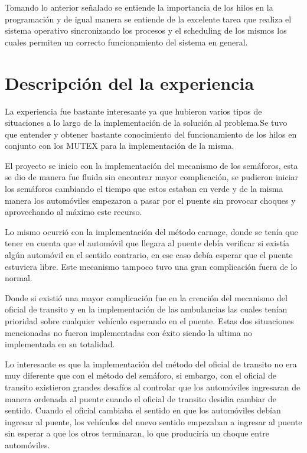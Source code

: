 \documentclass[16pt,a4papper]{article}
\begin{document}
	Tomando lo anterior señalado se entiende la importancia de los hilos en la programación y de igual manera se entiende de la excelente tarea que realiza el sistema operativo sincronizando los procesos y el scheduling de los mismos los cuales permiten un correcto funcionamiento del sistema en general.
	
	\newpage
	\section{Descripción del la experiencia}
	La experiencia fue bastante interesante ya que hubieron varios tipos de situaciones a lo largo de la implementación de la solución al problema.Se tuvo que entender y obtener bastante conocimiento  del funcionamiento de los hilos en conjunto con los MUTEX para la implementación de la misma.\par  
	
	El proyecto se inicio con la implementación del mecanismo de los semáforos, esta se dio de manera fue fluida sin encontrar mayor complicación, se pudieron iniciar los semáforos cambiando el tiempo que estos estaban en verde y de la misma manera los automóviles empezaron a pasar por el puente sin provocar choques y aprovechando al máximo este recurso. \par
	
	Lo mismo ocurrió con la implementación del método carnage, donde se tenía que tener en cuenta que el automóvil que llegara al puente debía verificar si existía algún automóvil en el sentido contrario, en ese caso debía esperar que el puente estuviera libre. Este mecanismo tampoco tuvo una gran complicación fuera de lo normal.\par
	
	Donde si existió una mayor complicación fue en la creación del mecanismo del oficial de transito y en la implementación de las ambulancias las cuales tenían prioridad sobre cualquier vehículo esperando en el puente. Estas dos situaciones mencionadas no fueron implementadas con éxito siendo la ultima no implementada en su totalidad.\par 
	
	Lo interesante es que la implementación del método del oficial de transito no era muy diferente que con el método del semáforo, si embargo, con el oficial de transito existieron grandes desafíos al controlar que los automóviles ingresaran de manera ordenada al puente cuando el oficial de transito desidia cambiar de sentido. Cuando el oficial cambiaba el sentido en que los automóviles debían ingresar al puente, los vehículos del nuevo sentido empezaban a ingresar al puente sin esperar a que los otros terminaran, lo que produciría un choque entre automóviles.\par 
	
\end{document}
